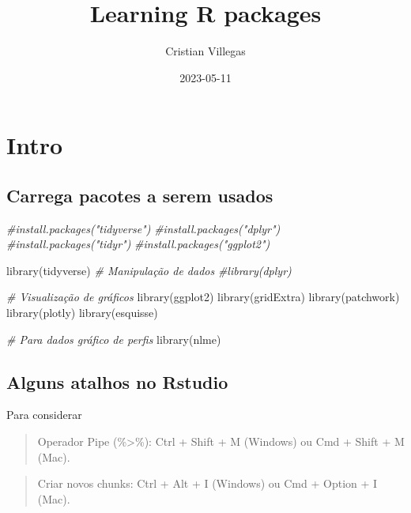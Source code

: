 \documentclass[
]{book}
\title{Learning R packages}
\author{Cristian Villegas}
\date{2023-05-11}
\newenvironment{Shaded}{\begin{snugshade}}{\end{snugshade}}
\newcommand{\CommentTok}[1]{\textcolor[rgb]{0.56,0.35,0.01}{\textit{#1}}}
\newcommand{\FunctionTok}[1]{\textcolor[rgb]{0.00,0.00,0.00}{#1}}
\newcommand{\NormalTok}[1]{#1}
\begin{document}
\maketitle

{
\setcounter{tocdepth}{1}
\tableofcontents
}
\hypertarget{intro}{%
\chapter{Intro}\label{intro}}

\hypertarget{carrega-pacotes-a-serem-usados}{%
\section{Carrega pacotes a serem usados}\label{carrega-pacotes-a-serem-usados}}

\begin{Shaded}
\begin{Highlighting}[]
\CommentTok{\#install.packages("tidyverse") }
\CommentTok{\#install.packages("dplyr")     }
\CommentTok{\#install.packages("tidyr")     }
\CommentTok{\#install.packages("ggplot2")   }

\FunctionTok{library}\NormalTok{(tidyverse)}
\CommentTok{\# Manipulação de dados}
\CommentTok{\#library(dplyr)}

\CommentTok{\# Visualização de gráficos}
\FunctionTok{library}\NormalTok{(ggplot2)}
\FunctionTok{library}\NormalTok{(gridExtra)}
\FunctionTok{library}\NormalTok{(patchwork)}
\FunctionTok{library}\NormalTok{(plotly)}
\FunctionTok{library}\NormalTok{(esquisse)}

\CommentTok{\# Para dados gráfico de perfis}
\FunctionTok{library}\NormalTok{(nlme)}
\end{Highlighting}
\end{Shaded}

\hypertarget{alguns-atalhos-no-rstudio}{%
\section{Alguns atalhos no Rstudio}\label{alguns-atalhos-no-rstudio}}

Para considerar

\begin{quote}
Operador Pipe (\%\textgreater\%): Ctrl + Shift + M (Windows) ou Cmd + Shift + M (Mac).
\end{quote}

\begin{quote}
Criar novos chunks: Ctrl + Alt + I (Windows) ou Cmd + Option + I (Mac).
\end{quote}
\end{document}
